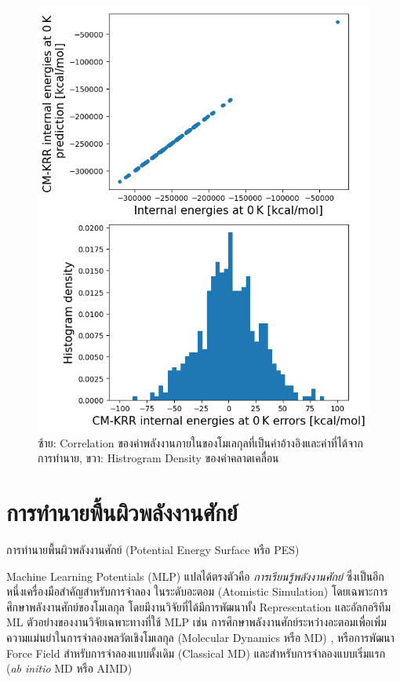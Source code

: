 \begin{figure}[htbp]
    \centering
    \includegraphics[width=0.8\linewidth]{fig/qm9_cm_kernel_corr.png}
    \caption{ซ้าย: Correlation ของค่าพลังงานภายในของโมเลกุลที่เป็นค่าอ้างอิงและค่าที่ได้จากการทำนาย, ขวา: Histrogram Density 
    ของค่าคลาดเคลื่อน}
    \label{fig:qm9_cm_kernel_corr}
\end{figure}

\section{การทำนายพื้นผิวพลังงานศักย์}
\label{sec:pred_pot_ener}

การทำนายพื้นผิวพลังงานศักย์ (Potential Energy Surface หรือ PES)

Machine Learning Potentials (MLP) แปลได้ตรงตัวคือ \textit{การเรียนรู้พลังงานศักย์} ซึ่งเป็นอีกหนึ่งเครื่องมือสำคัญสำหรับการจำลอง%
ในระดับอะตอม (Atomistic Simulation) โดยเฉพาะการศึกษาพลังงานศักย์ของโมเลกุล โดยมีงานวิจัยที่ได้มีการพัฒนาทั้ง Representation 
และอัลกอริทึม ML\autocite{behler2016,botu2017,brockherde2017} ตัวอย่างของงานวิจัยเฉพาะทางที่ใช้ MLP 
เช่น การศึกษาพลังงานศักย์ระหว่างอะตอมเพื่อเพิ่มความแม่นยำในการจำลองพลวัตเชิงโมเลกุล (Molecular Dynamics หรือ MD)%
\autocite{deringer2019,mortazavi2020,zuo2020,dhaliwal2022}, หรือการพัฒนา Force Field สำหรับการจำลองแบบดั้งเดิม 
(Classical MD)\autocite{noe2020} และสำหรับการจำลองแบบเริ่มแรก (\textit{ab initio} MD หรือ AIMD)%
\autocite{sivaraman2020,schran2021,li2022}

